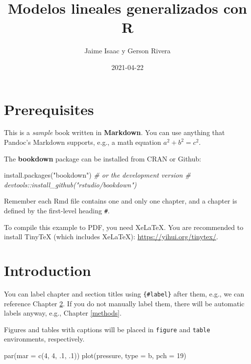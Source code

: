 \documentclass[
]{book}
\title{Modelos lineales generalizados con R}
\author{Jaime Isaac y Gerson Rivera}
\date{2021-04-22}
\newenvironment{Shaded}{\begin{snugshade}}{\end{snugshade}}
\newcommand{\AttributeTok}[1]{\textcolor[rgb]{0.77,0.63,0.00}{#1}}
\newcommand{\CommentTok}[1]{\textcolor[rgb]{0.56,0.35,0.01}{\textit{#1}}}
\newcommand{\DecValTok}[1]{\textcolor[rgb]{0.00,0.00,0.81}{#1}}
\newcommand{\FunctionTok}[1]{\textcolor[rgb]{0.00,0.00,0.00}{#1}}
\newcommand{\NormalTok}[1]{#1}
\newcommand{\StringTok}[1]{\textcolor[rgb]{0.31,0.60,0.02}{#1}}
\begin{document}
\maketitle

{
\setcounter{tocdepth}{1}
\tableofcontents
}
\hypertarget{prerequisites}{%
\chapter{Prerequisites}\label{prerequisites}}

This is a \emph{sample} book written in \textbf{Markdown}. You can use anything that Pandoc's Markdown supports, e.g., a math equation \(a^2 + b^2 = c^2\).

The \textbf{bookdown} package can be installed from CRAN or Github:

\begin{Shaded}
\begin{Highlighting}[]
\FunctionTok{install.packages}\NormalTok{(}\StringTok{"bookdown"}\NormalTok{)}
\CommentTok{\# or the development version}
\CommentTok{\# devtools::install\_github("rstudio/bookdown")}
\end{Highlighting}
\end{Shaded}

Remember each Rmd file contains one and only one chapter, and a chapter is defined by the first-level heading \texttt{\#}.

To compile this example to PDF, you need XeLaTeX. You are recommended to install TinyTeX (which includes XeLaTeX): \url{https://yihui.org/tinytex/}.

\hypertarget{intro}{%
\chapter{Introduction}\label{intro}}

You can label chapter and section titles using \texttt{\{\#label\}} after them, e.g., we can reference Chapter \ref{intro}. If you do not manually label them, there will be automatic labels anyway, e.g., Chapter \ref{methods}.

Figures and tables with captions will be placed in \texttt{figure} and \texttt{table} environments, respectively.

\begin{Shaded}
\begin{Highlighting}[]
\FunctionTok{par}\NormalTok{(}\AttributeTok{mar =} \FunctionTok{c}\NormalTok{(}\DecValTok{4}\NormalTok{, }\DecValTok{4}\NormalTok{, .}\DecValTok{1}\NormalTok{, .}\DecValTok{1}\NormalTok{))}
\FunctionTok{plot}\NormalTok{(pressure, }\AttributeTok{type =} \StringTok{\textquotesingle{}b\textquotesingle{}}\NormalTok{, }\AttributeTok{pch =} \DecValTok{19}\NormalTok{)}
\end{Highlighting}
\end{Shaded}
\end{document}
